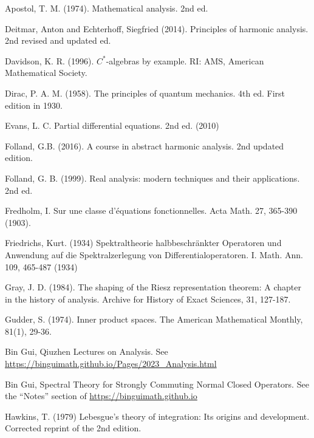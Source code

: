 \documentclass[12pt,b5paper,notitlepage]{article}
\theoremstyle{definition}
\theoremstyle{plain}
\numberwithin{equation}{section}
\begin{document}
\printindex	






	\begin{thebibliography}{999999}
		\footnotesize	

Apostol, T. M. (1974). Mathematical analysis. 2nd ed.

Deitmar, Anton and Echterhoff, Siegfried (2014). Principles of harmonic analysis. 2nd revised and updated ed.


Davidson, K. R. (1996). $C^*$-algebras by example. RI: AMS, American Mathematical Society.




Dirac, P. A. M. (1958). The principles of quantum mechanics. 4th ed. First edition in 1930.

Evans, L. C. Partial differential equations. 2nd ed. (2010)

Folland, G.B. (2016). A course in abstract harmonic analysis. 2nd updated edition.


Folland, G. B. (1999). Real analysis: modern techniques and their applications. 2nd ed.

Fredholm, I. Sur une classe d'{\'e}quations fonctionnelles. Acta Math. 27, 365-390 (1903).

Friedrichs, Kurt. (1934) Spektraltheorie halbbeschr{\"a}nkter {Operatoren} und {Anwendung} auf die {Spektralzerlegung} von {Differentialoperatoren}. {I}. Math. Ann. 109, 465-487 (1934)


Gray, J. D. (1984). The shaping of the Riesz representation theorem: A chapter in the history of analysis. Archive for History of Exact Sciences, 31, 127-187.

Gudder, S. (1974). Inner product spaces. The American Mathematical Monthly, 81(1), 29-36.

Bin Gui, Qiuzhen Lectures on Analysis. See \url{https://binguimath.github.io/Pages/2023_Analysis.html}

Bin Gui, Spectral Theory for Strongly Commuting Normal Closed Operators. See the ``Notes'' section of \url{https://binguimath.github.io}
%

Hawkins, T. (1979) Lebesgue's theory of integration: Its origins and development. Corrected reprint of the 2nd edition. 


\end{thebibliography}
\end{document}
